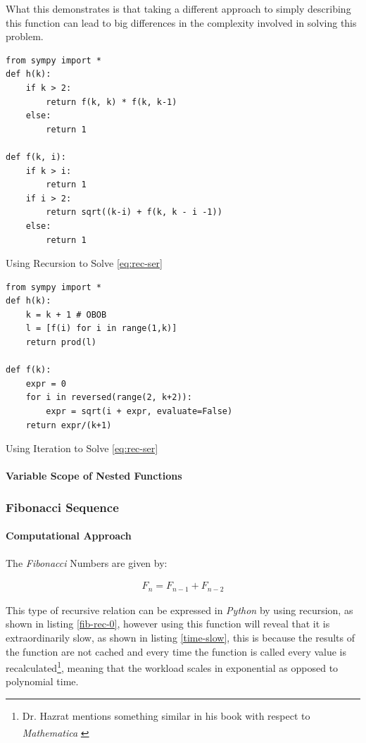 \documentclass[11pt]{article}
\begin{document}
What this demonstrates is that taking a different approach to simply describing
this function can lead to big differences in the complexity involved in solving
this problem.

\begin{listing}[htbp]
\begin{verbatim}
from sympy import *
def h(k):
    if k > 2:
        return f(k, k) * f(k, k-1)
    else:
        return 1

def f(k, i):
    if k > i:
        return 1
    if i > 2:
        return sqrt((k-i) + f(k, k - i -1))
    else:
        return 1
\end{verbatim}
\caption{\label{rec-two}Using Recursion to Solve \eqref{eq:rec-ser}}
\end{listing}


\begin{listing}[htbp]
\begin{verbatim}
from sympy import *
def h(k):
    k = k + 1 # OBOB
    l = [f(i) for i in range(1,k)]
    return prod(l)

def f(k):
    expr = 0
    for i in reversed(range(2, k+2)):
        expr = sqrt(i + expr, evaluate=False)
    return expr/(k+1)
\end{verbatim}
\caption{\label{iter-two}Using Iteration to Solve \eqref{eq:rec-ser}}
\end{listing}

\paragraph{Variable Scope of Nested Functions}
\label{variable-scope-nested}

\subsubsection{Fibonacci Sequence}
\label{sec:org4fde81a}
\paragraph{Computational Approach}
\label{define-the-fibonacci-numbers}
The \emph{Fibonacci} Numbers are given by:

\begin{align}
F_n = F_{n-1} + F_{n-2} \label{eq:fib-def}
\end{align}

This type of recursive relation can be expressed in \emph{Python} by using recursion,
as shown in listing \ref{fib-rec-0}, however using this function will reveal that it
is extraordinarily slow, as shown in listing \ref{time-slow}, this is because the
results of the function are not cached and every time the function is called
every value is recalculated\footnote{Dr. Hazrat mentions something similar in his book with respect to
\emph{Mathematica}\textsuperscript{\textregistered}
\cite[Ch. 13]{hazratMathematicaProblemCenteredApproach2015}}, meaning that the workload scales in
exponential as opposed to polynomial time.
\end{document}
